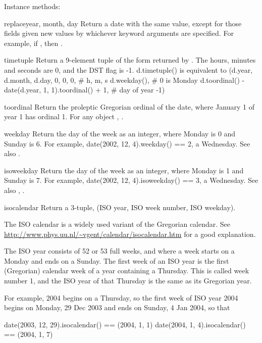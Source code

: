 Instance methods:

\begin{methoddesc}{replace}{year, month, day}
    Return a date with the same value, except for those fields given
    new values by whichever keyword arguments are specified.  For
    example, if , then
    .
\end{methoddesc}

\begin{methoddesc}{timetuple}{}
    Return a 9-element tuple of the form returned by
    .  The hours, minutes and seconds are
    0, and the DST flag is -1.
    d.timetuple() is equivalent to
        (d.year, d.month, d.day,
         0, 0, 0,  \# h, m, s
         d.weekday(),  \# 0 is Monday
         d.toordinal() - date(d.year, 1, 1).toordinal() + 1, \# day of year
         -1)
\end{methoddesc}
\begin{methoddesc}{toordinal}{}
    Return the proleptic Gregorian ordinal of the date, where January 1
    of year 1 has ordinal 1.  For any  object ,
    .
\end{methoddesc}
\begin{methoddesc}{weekday}{}
    Return the day of the week as an integer, where Monday is 0 and
    Sunday is 6.  For example, date(2002, 12, 4).weekday() == 2, a
    Wednesday.
    See also .
\end{methoddesc}
\begin{methoddesc}{isoweekday}{}
    Return the day of the week as an integer, where Monday is 1 and
    Sunday is 7.  For example, date(2002, 12, 4).isoweekday() == 3, a
    Wednesday.
    See also , .
\end{methoddesc}
\begin{methoddesc}{isocalendar}{}
    Return a 3-tuple, (ISO year, ISO week number, ISO weekday).

    The ISO calendar is a widely used variant of the Gregorian calendar.
    See \url{http://www.phys.uu.nl/~vgent/calendar/isocalendar.htm}
    for a good explanation.

    The ISO year consists of 52 or 53 full weeks, and where a week starts
    on a Monday and ends on a Sunday.  The first week of an ISO year is
    the first (Gregorian) calendar week of a year containing a Thursday.
    This is called week number 1, and the ISO year of that Thursday is
    the same as its Gregorian year.

    For example, 2004 begins on a Thursday, so the first week of ISO
    year 2004 begins on Monday, 29 Dec 2003 and ends on Sunday, 4 Jan
    2004, so that

    date(2003, 12, 29).isocalendar() == (2004, 1, 1)
    date(2004, 1, 4).isocalendar() == (2004, 1, 7)
\end{methoddesc}
